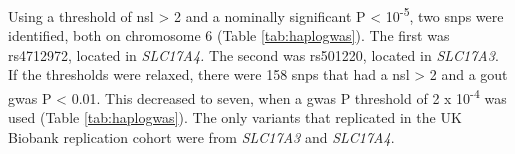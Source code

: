 \documentclass[twoside,openright]{report}
\begin{document}
Using a threshold of \textbar{}\gls{nsl}\textbar{} \textgreater{} 2 and
a nominally significant P \textless{} 10\textsuperscript{-5}, two
\glspl{snp} were identified, both on chromosome 6 (Table
\ref{tab:haplogwas}). The first was rs4712972, located in
\emph{SLC17A4.} The second was rs501220, located in \emph{SLC17A3}. If
the thresholds were relaxed, there were 158 \glspl{snp} that had a
\textbar{}\gls{nsl}\textbar{} \textgreater{} 2 and a gout \gls{gwas} P
\textless{} 0.01. This decreased to seven, when a \gls{gwas} P threshold
of 2 x 10\textsuperscript{-4} was used (Table \ref{tab:haplogwas}). The
only variants that replicated in the UK Biobank replication cohort were
from \emph{SLC17A3} and \emph{SLC17A4}.

\begin{landscape}\begin{table}


\end{table}
\end{landscape}
\end{document}
